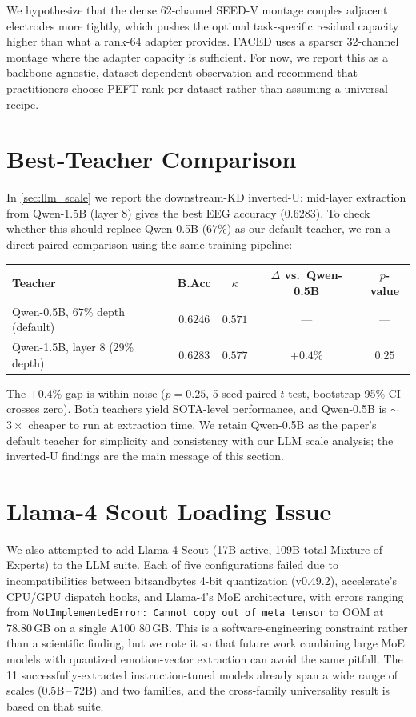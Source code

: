 We hypothesize that the dense $62$-channel SEED-V montage couples adjacent electrodes more tightly, which pushes the optimal task-specific residual capacity higher than what a rank-$64$ adapter provides. FACED uses a sparser $32$-channel montage where the adapter capacity is sufficient. For now, we report this as a backbone-agnostic, dataset-dependent observation and recommend that practitioners choose PEFT rank per dataset rather than assuming a universal recipe.

\section{Best-Teacher Comparison}
\label{sec:supp_best_teacher}

In \cref{sec:llm_scale} we report the downstream-KD inverted-U: mid-layer extraction from Qwen-1.5B (layer 8) gives the best EEG accuracy ($0.6283$). To check whether this should replace Qwen-0.5B ($67$\%) as our default teacher, we ran a direct paired comparison using the same training pipeline:

\begin{center}
\small
\begin{tabular}{lcccc}
\toprule
Teacher & B.Acc & $\kappa$ & $\Delta$ vs.\ Qwen-0.5B & $p$-value \\
\midrule
Qwen-0.5B, $67$\% depth (default) & $0.6246$ & $0.571$ & --- & --- \\
Qwen-1.5B, layer 8 ($29$\% depth) & $\mathbf{0.6283}$ & $\mathbf{0.577}$ & $+0.4\%$ & $0.25$ \\
\bottomrule
\end{tabular}
\end{center}

The $+0.4\%$ gap is within noise ($p = 0.25$, 5-seed paired $t$-test, bootstrap 95\% CI crosses zero). Both teachers yield SOTA-level performance, and Qwen-0.5B is $\sim$$3\times$ cheaper to run at extraction time. We retain Qwen-0.5B as the paper's default teacher for simplicity and consistency with our LLM scale analysis; the inverted-U findings are the main message of this section.

\section{Llama-4 Scout Loading Issue}
\label{sec:supp_llama4}

We also attempted to add Llama-4 Scout (17B active, 109B total Mixture-of-Experts) to the LLM suite. Each of five configurations failed due to incompatibilities between bitsandbytes 4-bit quantization (v0.49.2), accelerate's CPU/GPU dispatch hooks, and Llama-4's MoE architecture, with errors ranging from \texttt{NotImplementedError: Cannot copy out of meta tensor} to OOM at $78.80$\,GB on a single A100 80\,GB. This is a software-engineering constraint rather than a scientific finding, but we note it so that future work combining large MoE models with quantized emotion-vector extraction can avoid the same pitfall. The 11 successfully-extracted instruction-tuned models already span a wide range of scales ($0.5$B\,--\,$72$B) and two families, and the cross-family universality result is based on that suite.

